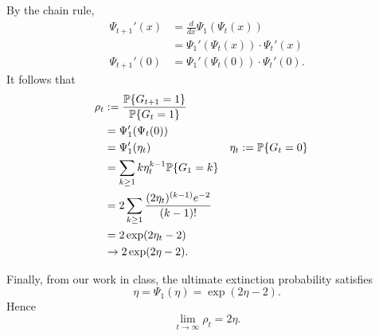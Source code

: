 \documentclass[10pt]{article}
\DeclarePairedDelimiter{\set}{\lbrace}{\rbrace}
\renewcommand{\P}{\mathbb{P}}
\begin{document}
By the chain rule,
\begin{align*}
  \Psi_{t+1}'(x)
  &= \frac{d}{dx} \Psi_1(\Psi_t(x)) \\
  &= \Psi_1'(\Psi_t(x))\cdot \Psi_t'(x) \\
  \Psi_{t+1}'(0)
  &= \Psi_1'(\Psi_t(0))\cdot \Psi_t'(0).
\end{align*}
It follows that
\begin{align*}
  \rho_t
  &:= \frac{\P\set{G_{t+1} = 1}}{\P\set{G_t=1}} \\
  &= \Psi_1'(\Psi_t(0)) \\
  &= \Psi_1'(\eta_t) &&\eta_t := \P\set{G_t = 0} \\
  &= \sum_{k\geq 1} k\eta_t^{k-1} \P\set{G_1 = k} \\
  &= 2 \sum_{k\geq 1} \frac{(2\eta_t)^{(k-1)} e^{-2}}{(k-1)!} \\
  &= 2 \exp(2\eta_t-2) \\
  &\to 2\exp(2\eta - 2).
\end{align*}

Finally,
from our work in class,
the ultimate extinction probability satisfies
\[
  \eta = \Psi_1(\eta) = \exp(2\eta-2).
\]
Hence
\[
  \boxed{\lim_{t\to \infty} \rho_t = 2\eta}.
\]
\end{document}
